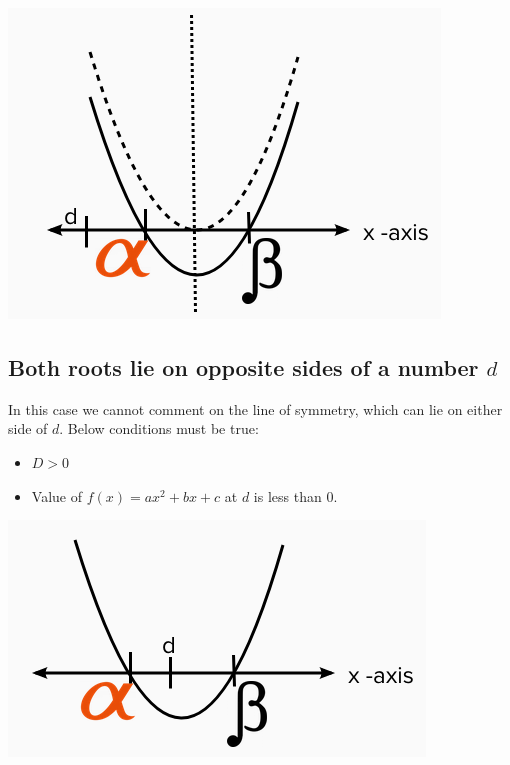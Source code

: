 \documentclass{book}
\begin{document}
	\includegraphics[scale=0.6]{condition1}
	
	\subsection{Both roots lie on opposite sides of a number $d$}
	In this case we cannot comment on the line of symmetry, which can lie on either side of $d$. Below conditions must be true:
	\begin{itemize}
		\item $D>0$
		\item Value of $f(x) = ax^2 +bx + c$ at $d$ is less than $0$.
	\end{itemize}
	
	\includegraphics[scale=0.6]{condition2}
	
\end{document}
